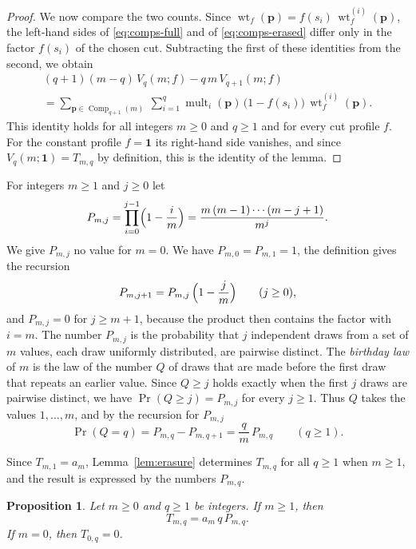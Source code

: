 \documentclass{amsart}
\makeatletter
\newtheorem{proposition}[theorem]{Proposition}
\theoremstyle{definition}
\theoremstyle{remark}
\numberwithin{equation}{section}
\def\subsection{\@startsection{subsection}{2}\z@{.5\linespacing\@plus.7\linespacing}{-.5em}{\normalfont\bfseries\boldmath}}
\makeatother
\begin{document}
\begin{proof}
We now compare the two counts. Since $\operatorname{wt}_f(\mathbf p)=f(s_i)\,\operatorname{wt}_f^{(i)}(\mathbf p)$, the left-hand sides of \eqref{eq:comps-full} and of \eqref{eq:comps-erased} differ only in the factor $f(s_i)$ of the chosen cut. Subtracting the first of these identities from the second, we obtain
\begin{multline}\label{eq:comps-defect}
(q+1)(m-q)\,V_q(m;f)-q\,m\,V_{q+1}(m;f)\\
=\sum_{\mathbf p\in\operatorname{Comp}_{q+1}(m)}\ \sum_{i=1}^{q}\operatorname{mult}_i(\mathbf p)\,\bigl(1-f(s_i)\bigr)\,\operatorname{wt}_f^{(i)}(\mathbf p).
\end{multline}
This identity holds for all integers $m\ge 0$ and $q\ge 1$ and for every cut profile $f$. For the constant profile $f=\mathbf 1$ its right-hand side vanishes, and since $V_q(m;\mathbf 1)=T_{m,q}$ by definition, this is the identity of the lemma.
\end{proof}

\subsection{The birthday law}\label{subsec:comps-birthday}

For integers $m\ge 1$ and $j\ge 0$ let
\[
P_{m,j}=\prod_{i=0}^{j-1}\Bigl(1-\frac{i}{m}\Bigr)=\frac{m\,(m-1)\cdots(m-j+1)}{m^{j}} .
\]
We give $P_{m,j}$ no value for $m=0$. We have $P_{m,0}=P_{m,1}=1$, the definition gives the recursion
\[
P_{m,j+1}=P_{m,j}\,\Bigl(1-\frac{j}{m}\Bigr)\qquad(j\ge 0),
\]
and $P_{m,j}=0$ for $j\ge m+1$, because the product then contains the factor with $i=m$. The number $P_{m,j}$ is the probability that $j$ independent draws from a set of $m$ values, each draw uniformly distributed, are pairwise distinct. The \emph{birthday law} of $m$ is the law of the number $Q$ of draws that are made before the first draw that repeats an earlier value. Since $Q\ge j$ holds exactly when the first $j$ draws are pairwise distinct, we have $\Pr(Q\ge j)=P_{m,j}$ for every $j\ge 1$. Thus $Q$ takes the values $1,\dots,m$, and by the recursion for $P_{m,j}$
\[
\Pr(Q=q)=P_{m,q}-P_{m,q+1}=\frac{q}{m}\,P_{m,q}\qquad(q\ge 1).
\]

Since $T_{m,1}=a_m$, Lemma~\ref{lem:erasure} determines $T_{m,q}$ for all $q\ge 1$ when $m\ge 1$, and the result is expressed by the numbers $P_{m,q}$.

\begin{proposition}\label{prop:birthday}
Let $m\ge 0$ and $q\ge 1$ be integers. If $m\ge 1$, then
\[
T_{m,q}=a_m\,q\,P_{m,q}.
\]
If $m=0$, then $T_{0,q}=0$.
\end{proposition}
\end{document}
